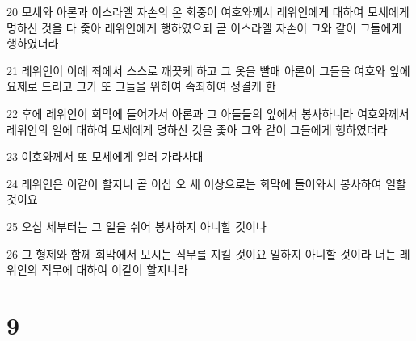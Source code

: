 \par 20 모세와 아론과 이스라엘 자손의 온 회중이 여호와께서 레위인에게 대하여 모세에게 명하신 것을 다 좇아 레위인에게 행하였으되 곧 이스라엘 자손이 그와 같이 그들에게 행하였더라
\par 21 레위인이 이에 죄에서 스스로 깨끗케 하고 그 옷을 빨매 아론이 그들을 여호와 앞에 요제로 드리고 그가 또 그들을 위하여 속죄하여 정결케 한
\par 22 후에 레위인이 회막에 들어가서 아론과 그 아들들의 앞에서 봉사하니라 여호와께서 레위인의 일에 대하여 모세에게 명하신 것을 좇아 그와 같이 그들에게 행하였더라
\par 23 여호와께서 또 모세에게 일러 가라사대
\par 24 레위인은 이같이 할지니 곧 이십 오 세 이상으로는 회막에 들어와서 봉사하여 일할 것이요
\par 25 오십 세부터는 그 일을 쉬어 봉사하지 아니할 것이나
\par 26 그 형제와 함께 회막에서 모시는 직무를 지킬 것이요 일하지 아니할 것이라 너는 레위인의 직무에 대하여 이같이 할지니라

\chapter{9}

